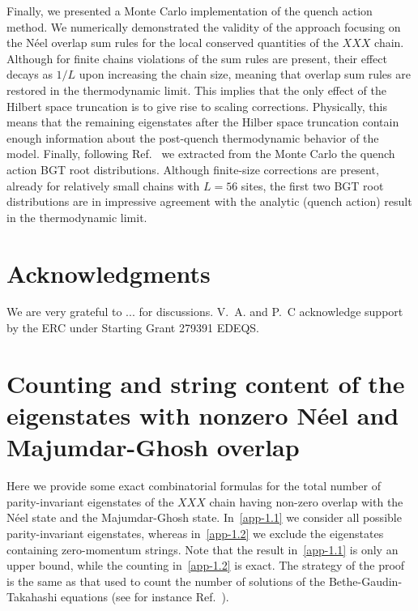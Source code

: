 \documentclass[11pt]{iopart}
\begin{document}
Finally, we presented a Monte Carlo implementation of the quench action method. 
We numerically demonstrated the validity of the approach focusing on the N\'eel 
overlap sum rules for the local conserved quantities of the $XXX$ chain. Although 
for finite chains violations of the sum rules are present, their effect decays 
as $1/L$ upon increasing the chain size, meaning that overlap sum rules are 
restored in the thermodynamic limit. This implies that the only effect of the 
Hilbert space truncation is to give rise to scaling corrections. Physically, 
this means that the remaining eigenstates after the Hilber space truncation 
contain enough information about the post-quench thermodynamic behavior of the 
model. Finally, following Ref.~\cite{alba-2015} we extracted from the Monte Carlo 
the quench action BGT root distributions. Although finite-size corrections are 
present, already for relatively small chains with $L=56$ sites, the first two 
BGT root distributions are in impressive agreement with the analytic (quench action) 
result in the thermodynamic limit. 

\section*{Acknowledgments}

We are very grateful to ... for discussions. V.~A. and P.~C acknowledge 
support by the ERC under Starting Grant 279391 EDEQS. 


\appendix

\section{Counting and string content of the eigenstates with nonzero N\'eel and 
Majumdar-Ghosh overlap}
\label{app-1}

Here we provide some exact combinatorial formulas for the total number of 
parity-invariant eigenstates of the $XXX$ chain having non-zero overlap with 
the N\'eel state and the Majumdar-Ghosh state. 
In~\ref{app-1.1} we consider all possible parity-invariant 
eigenstates, whereas in~\ref{app-1.2} we exclude the eigenstates containing 
zero-momentum strings. Note that the result in~\ref{app-1.1} is only an upper 
bound, while the counting in~\ref{app-1.2} is exact. The strategy of the proof 
is the same as that used to count the number of solutions of the 
Bethe-Gaudin-Takahashi equations (see for instance Ref.~\cite{faddeev-1996}). 
\end{document}
